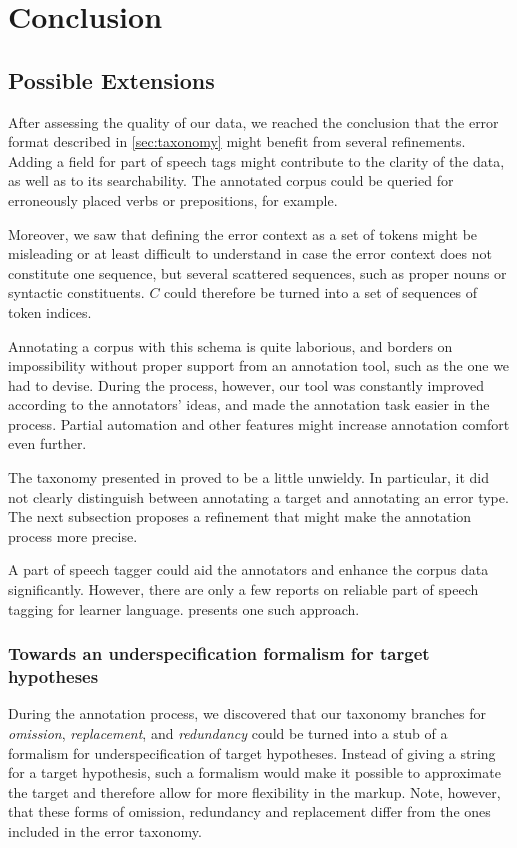 \documentclass{article}
\begin{document}
\section{Conclusion}

\subsection{Possible Extensions}

After assessing the quality of our data, we reached
the conclusion that the error format described in \ref{sec:taxonomy}
might benefit from several refinements. Adding a field for part of speech tags
might contribute to the clarity of the data, as well as to its searchability.
The annotated corpus could be queried for erroneously placed verbs or
prepositions, for example.

Moreover, we saw that defining the error context as a set of
tokens might be misleading or at least difficult to understand in case the error
context does not constitute one sequence, but several scattered sequences, such
as proper nouns or syntactic constituents. $C$ could therefore be turned into a
set of sequences of token indices.

Annotating a corpus with this schema is quite laborious, and borders on
impossibility without proper support from an annotation tool, such as the one we
had to devise. During the process, however, our tool was constantly improved
according to the annotators' ideas, and made the annotation task easier in
the process. Partial automation and other features might increase annotation
comfort even further.

The taxonomy presented in \label{taxonomy} proved to be a little unwieldy. In
particular, it did not clearly distinguish between annotating a target and
annotating an error type. The next subsection proposes a refinement that might
make the annotation process more precise.

A part of speech tagger could aid the annotators and enhance the corpus data
significantly. However, there are only a few reports on reliable part of speech
tagging for learner language. \cite{ludeling} presents one such approach.

\subsubsection{Towards an underspecification formalism for target hypotheses}

During the annotation process, we discovered that our taxonomy branches for
\textit{omission}, \textit{replacement}, and \textit{redundancy} could be turned
into a stub of a formalism for underspecification of target hypotheses. Instead
of giving a string for a target hypothesis, such a formalism would make it
possible to approximate the target and therefore allow for more flexibility in
the markup. Note, however, that these forms of omission, redundancy and
replacement differ from the ones included in the error taxonomy.
\end{document}
